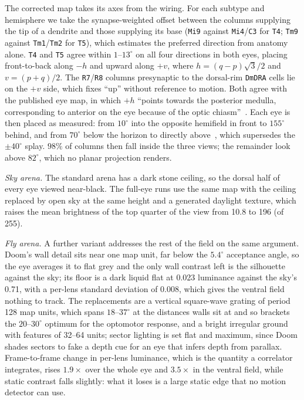 \documentclass[10pt,twoside]{article}
\newcommand{\cell}[1]{\texttt{#1}}
\begin{document}
The corrected map takes its axes from the wiring. For each subtype and
hemisphere we take the synapse-weighted offset between the columns supplying
the tip of a dendrite and those supplying its base (\cell{Mi9} against
\cell{Mi4}/\cell{C3} for \cell{T4}; \cell{Tm9} against
\cell{Tm1}/\cell{Tm2} for \cell{T5}), which estimates the preferred
direction from anatomy alone. \cell{T4} and \cell{T5} agree within
$1$--$13^\circ$ on all four directions in both eyes, placing front-to-back
along $-h$ and upward along $+v$, where $h=(q-p)\sqrt3/2$ and $v=(p+q)/2$. The
\cell{R7}/\cell{R8} columns presynaptic to the dorsal-rim \cell{DmDRA} cells
lie on the $+v$ side, which fixes ``up'' without reference to motion. Both
agree with the published eye map, in which $+h$ ``points towards the posterior
medulla, corresponding to anterior on the eye because of the optic
chiasm''~\citep{zhao2025}. Each eye is then placed as measured: from
$10^\circ$ into the opposite hemifield in front to $155^\circ$ behind, and
from $70^\circ$ below the horizon to directly
above~\citep{zhao2025,kemppainen2022}, which supersedes the $\pm40^\circ$
splay. $98\%$ of columns then fall inside the three views; the remainder look
above $82^\circ$, which no planar projection renders.

\emph{Sky arena.} The standard arena has a dark stone ceiling, so the dorsal
half of every eye viewed near-black. The full-eye runs use the same map with
the ceiling replaced by open sky at the same height and a generated daylight
texture, which raises the mean brightness of the top quarter of the view from
10.8 to 196 (of 255).

\emph{Fly arena.} A further variant addresses the rest of the field on the same
argument. Doom's wall detail sits near one map unit, far below the $5.4^\circ$
acceptance angle, so the eye averages it to flat grey and the only wall
contrast left is the silhouette against the sky; its floor is a dark liquid
flat at 0.023 luminance against the sky's 0.71, with a per-lens standard
deviation of 0.008, which gives the ventral field nothing to track. The
replacements are a vertical square-wave grating of period 128 map units, which
spans $18$--$37^\circ$ at the distances walls sit at and so brackets the
$20$--$30^\circ$ optimum for the optomotor response, and a bright irregular
ground with features of 32--64 units; sector lighting is set flat and maximum,
since Doom shades sectors to fake a depth cue for an eye that infers depth from
parallax. Frame-to-frame change in per-lens luminance, which is the quantity a
correlator integrates, rises $1.9\times$ over the whole eye and $3.5\times$ in
the ventral field, while static contrast falls slightly: what it loses is a
large static edge that no motion detector can use.
\end{document}
